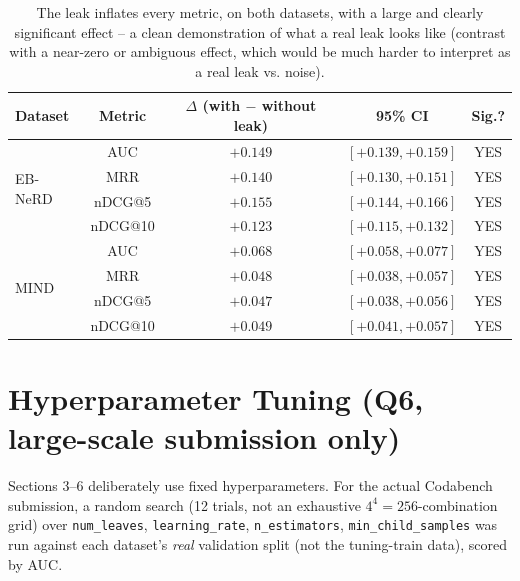 \documentclass[11pt,a4paper]{article}
\begin{document}
\begin{table}[h]
\centering\small
\begin{tabular}{l cccc}
\toprule
\textbf{Dataset} & \textbf{Metric} & \textbf{$\Delta$ (with $-$ without leak)} & \textbf{95\% CI} & \textbf{Sig.?} \\
\midrule
\multirow{4}{*}{EB-NeRD}
 & AUC     & $+0.149$ & $[+0.139, +0.159]$ & YES \\
 & MRR     & $+0.140$ & $[+0.130, +0.151]$ & YES \\
 & nDCG@5  & $+0.155$ & $[+0.144, +0.166]$ & YES \\
 & nDCG@10 & $+0.123$ & $[+0.115, +0.132]$ & YES \\
\midrule
\multirow{4}{*}{MIND}
 & AUC     & $+0.068$ & $[+0.058, +0.077]$ & YES \\
 & MRR     & $+0.048$ & $[+0.038, +0.057]$ & YES \\
 & nDCG@5  & $+0.047$ & $[+0.038, +0.056]$ & YES \\
 & nDCG@10 & $+0.049$ & $[+0.041, +0.057]$ & YES \\
\bottomrule
\end{tabular}
\caption{The leak inflates every metric, on both datasets, with a large and clearly
significant effect -- a clean demonstration of what a real leak looks like (contrast
with a near-zero or ambiguous effect, which would be much harder to interpret as a real
leak vs. noise).}
\label{tab:q9}
\end{table}

\section{Hyperparameter Tuning (Q6, large-scale submission only)}

Sections 3--6 deliberately use fixed hyperparameters. For the actual Codabench
submission, a random search (12 trials, not an exhaustive $4^4{=}256$-combination
grid) over \texttt{num\_leaves}, \texttt{learning\_rate}, \texttt{n\_estimators},
\texttt{min\_child\_samples} was run against each dataset's \emph{real} validation
split (not the tuning-train data), scored by AUC.
\end{document}
